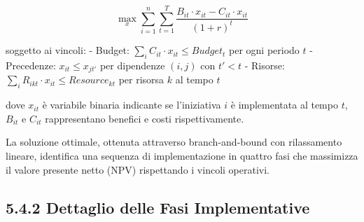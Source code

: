 \begin{equation}
    \max_{x} \sum_{i=1}^{n} \sum_{t=1}^{T} \frac{B_{it} \cdot x_{it} - C_{it} \cdot x_{it}}{(1+r)^t}
\end{equation}

soggetto ai vincoli:
- Budget: $\sum_{i} C_{it} \cdot x_{it} \leq Budget_t$ per ogni periodo $t$
- Precedenze: $x_{it} \leq x_{jt'}$ per dipendenze $(i,j)$ con $t' < t$
- Risorse: $\sum_{i} R_{ikt} \cdot x_{it} \leq Resource_{kt}$ per risorsa $k$ al tempo $t$

dove $x_{it}$ è variabile binaria indicante se l'iniziativa $i$ è implementata al tempo $t$, $B_{it}$ e $C_{it}$ rappresentano benefici e costi rispettivamente.

La soluzione ottimale, ottenuta attraverso branch-and-bound con rilassamento lineare, identifica una sequenza di implementazione in quattro fasi che massimizza il valore presente netto (NPV) rispettando i vincoli operativi.

\subsection{5.4.2 Dettaglio delle Fasi Implementative}

